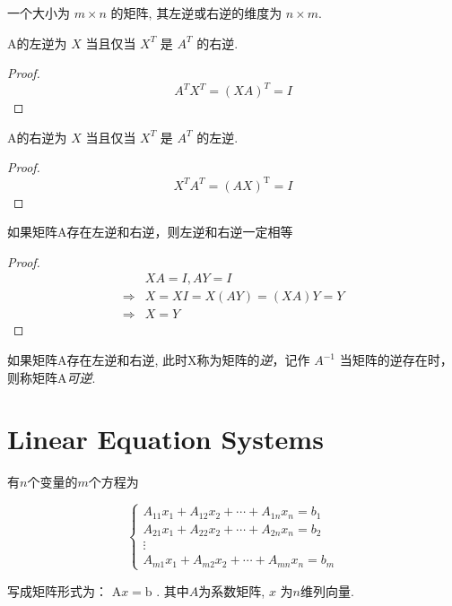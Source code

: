 一个大小为 $ m \times n $ 的矩阵, 其左逆或右逆的维度为 $ n \times m $.

\begin{theorem}
    A的左逆为 $ X $ 当且仅当 $ X^{T} $ 是 $ A^{T} $ 的右逆.
\end{theorem}

\begin{proof}
    $$
A^{T} X^{T}=(X A)^{T}=I
$$
\end{proof}

\begin{theorem}
    A的右逆为 $ X $ 当且仅当 $ X^{T} $ 是 $ A^{T} $ 的左逆.
\end{theorem}

\begin{proof}
    $$
X^{T} A^{T}=(A X)^{\mathrm{T}}=I
$$
\end{proof}

\begin{theorem}
    如果矩阵A存在左逆和右逆，则左逆和右逆一定相等
\end{theorem}

\begin{proof}
    $$
    \begin{aligned}
    &X A=I, A Y=I  \\
    \Rightarrow&  X=X I=X(A Y)=(X A) Y=Y \\
    \Rightarrow& X=Y
    \end{aligned}
$$
\end{proof}

\begin{definition}
    如果矩阵A存在左逆和右逆, 此时X称为矩阵的\textit{逆}，记作 $ A^{-1} $ 当矩阵的逆存在时，则称矩阵A\textit{可逆}.
\end{definition}

\section{Linear Equation Systems}

\begin{definition}
    有$n$个变量的$m$个方程为

    $$ \left\{\begin{array}{c}A_{11} x_{1}+A_{12} x_{2}+\cdots+A_{1 n} x_{n}=b_{1} \\ A_{21} x_{1}+A_{22} x_{2}+\cdots+A_{2 n} x_{n}=b_{2} \\ \vdots \\ A_{m 1} x_{1}+A_{m 2} x_{2}+\cdots+A_{m n} x_{n}=b_{m}\end{array}\right. $$

    写成矩阵形式为： $ \mathrm{A} x=\mathrm{b} $ . 其中$A$为系数矩阵, $ x $ 为$n$维列向量. 
\end{definition}

